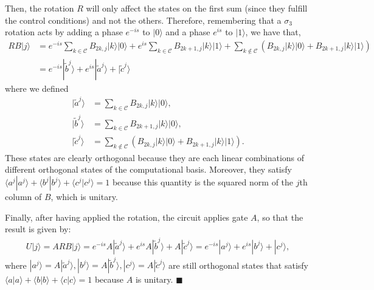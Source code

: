 \documentclass[10pt,letterpaper]{article} %
\begin{document}
Then, the rotation $R$ will only affect the states on the first sum (since they fulfill the control conditions)
and not the others. Therefore,  
remembering that a $\sigma_3$ rotation acts by adding a phase $e^{-is}$ to $|0\rangle$
and a phase $e^{is}$ to $|1\rangle$, we have that,
\begin{align}
RB|j\rangle& = e^{-is} \sum_{k \in \mathcal{C}} B_{2k,j} |k\rangle |0\rangle + e^{is} \sum_{k \in \mathcal{C}} B_{2k+1,j} |k\rangle |1\rangle 
+ \sum_{k \not\in \mathcal{C}} \left( B_{2k,j} |k\rangle|0\rangle  + B_{2k+1,j} |k \rangle |1\rangle  \right) \nonumber \\
& = e^{-is} |\tilde{b}^{j}\rangle + e^{is} |\tilde{a}^j\rangle + |\tilde{c}^j\rangle
\end{align}
where we defined
\begin{align*}
|\tilde{a}^j \rangle &= \sum_{k \in \mathcal{C}} B_{2k,j}|k\rangle|0\rangle,\\
|\tilde{b}^j\rangle &= \sum_{k \in \mathcal{C}} B_{2k+1,j} |k\rangle |0 \rangle,\\
|\tilde{c}^j\rangle &= \sum_{k \not\in \mathcal{C}}\left( B_{2k,j} |k\rangle|0\rangle+ B_{2k+1,j} |k \rangle |1\rangle  \right).
\end{align*}
These states are clearly orthogonal because they are each linear combinations of different 
orthogonal states of the computational basis. 
Moreover, they satisfy  $\langle a^j| a^j\rangle + \langle b^j| b^j\rangle + \langle c^j| c^j\rangle = 1$ because this quantity is the squared norm of the $j$th column of $B$, 
which is unitary.

Finally, after having applied the rotation, the circuit applies gate $A$, 
so that the result is given by:
\begin{eqnarray}
U|j\rangle = ARB|j\rangle = e^{-is} A |\tilde{a}^j\rangle + e^{is} A |\tilde{b}^j\rangle + A |\tilde{c}^j\rangle = e^{-is} |a^j\rangle + e^{is} |b^j\rangle + |c^j\rangle,
\end{eqnarray}
where $|a^j\rangle = A |\tilde{a}^j\rangle, |b^j\rangle = A |\tilde{b}^j\rangle, |c^j\rangle = A |\tilde{c}^j\rangle$ are still orthogonal
states that satisfy $\langle a| a\rangle + \langle b| b\rangle + \langle c| c\rangle = 1$ because $A$ is unitary. $\blacksquare$  \\
 $\;$ \\
\end{document}
